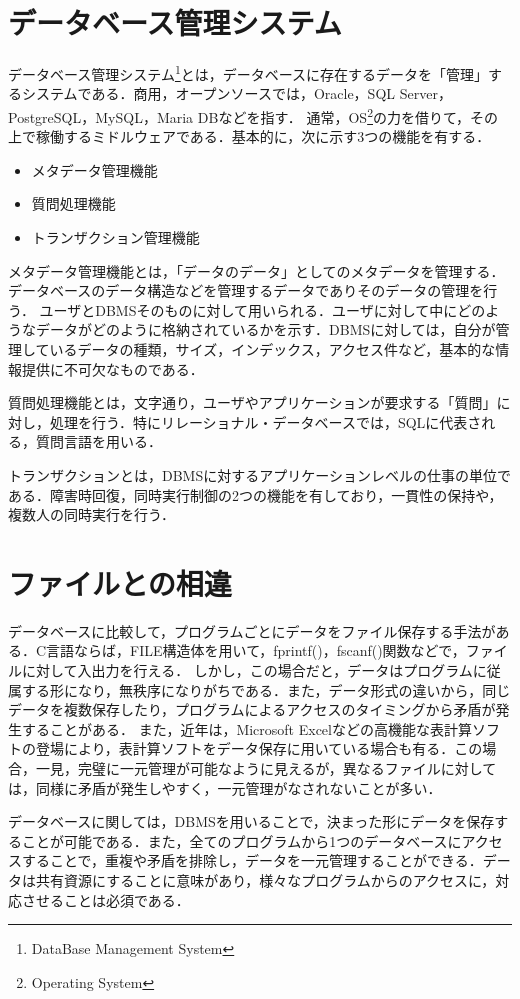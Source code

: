 \documentclass[a4paper,10pt]{jreport}
\begin{document}
\section{データベース管理システム}
データベース管理システム\footnote{DataBase Management System}とは，データベースに存在するデータを「管理」するシステムである．商用，オープンソースでは，Oracle，SQL Server，PostgreSQL，MySQL，Maria DBなどを指す．
通常，OS\footnote{Operating System}の力を借りて，その上で稼働するミドルウェアである．基本的に，次に示す3つの機能を有する．
\begin{itemize}
	\item メタデータ管理機能
	\item 質問処理機能
	\item トランザクション管理機能
\end{itemize}
\par メタデータ管理機能とは，「データのデータ」としてのメタデータを管理する．データベースのデータ構造などを管理するデータでありそのデータの管理を行う．
ユーザとDBMSそのものに対して用いられる．ユーザに対して中にどのようなデータがどのように格納されているかを示す．DBMSに対しては，自分が管理しているデータの種類，サイズ，インデックス，アクセス件など，基本的な情報提供に不可欠なものである．
\par 質問処理機能とは，文字通り，ユーザやアプリケーションが要求する「質問」に対し，処理を行う．特にリレーショナル・データベースでは，SQLに代表される，質問言語を用いる．
\par トランザクションとは，DBMSに対するアプリケーションレベルの仕事の単位である．障害時回復，同時実行制御の2つの機能を有しており，一貫性の保持や，複数人の同時実行を行う．

\section{ファイルとの相違}
データベースに比較して，プログラムごとにデータをファイル保存する手法がある．C言語ならば，FILE構造体を用いて，fprintf()，fscanf()関数などで，ファイルに対して入出力を行える．
しかし，この場合だと，データはプログラムに従属する形になり，無秩序になりがちである．また，データ形式の違いから，同じデータを複数保存したり，プログラムによるアクセスのタイミングから矛盾が発生することがある．
また，近年は，Microsoft Excelなどの高機能な表計算ソフトの登場により，表計算ソフトをデータ保存に用いている場合も有る．この場合，一見，完璧に一元管理が可能なように見えるが，異なるファイルに対しては，同様に矛盾が発生しやすく，一元管理がなされないことが多い．
\par データベースに関しては，DBMSを用いることで，決まった形にデータを保存することが可能である．また，全てのプログラムから1つのデータベースにアクセスすることで，重複や矛盾を排除し，データを一元管理することができる．データは共有資源にすることに意味があり，様々なプログラムからのアクセスに，対応させることは必須である．
\end{document}
